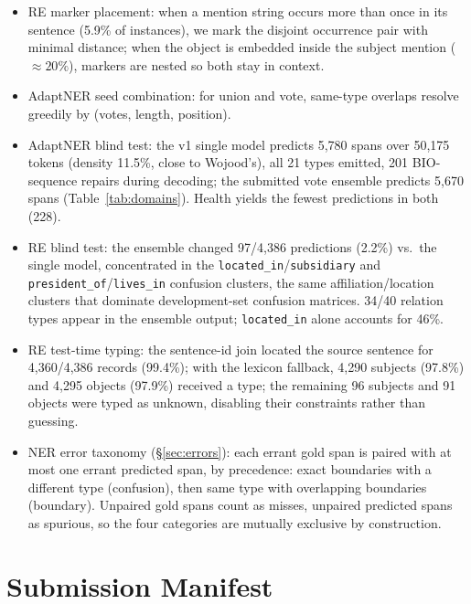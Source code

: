 \documentclass[11pt]{article}
\begin{document}
\begin{itemize}
\item RE marker placement: when a mention string occurs more than once
  in its sentence (5.9\% of instances), we mark the disjoint occurrence
  pair with minimal distance; when the object is embedded inside the
  subject mention (${\approx}20\%$), markers are nested so both stay in
  context.
\item AdaptNER seed combination: for union and vote, same-type overlaps
  resolve greedily by (votes, length, position).
\item AdaptNER blind test: the v1 single model predicts 5,780 spans over
  50,175 tokens (density 11.5\%, close to Wojood's), all 21 types emitted,
  201 BIO-sequence repairs during decoding; the submitted vote ensemble
  predicts 5,670 spans (Table~\ref{tab:domains}). Health yields the fewest
  predictions in both (228).
\item RE blind test: the ensemble changed 97/4,386 predictions (2.2\%)
  vs.\ the single model, concentrated in the
  \texttt{located\_in}/\texttt{subsidiary} and
  \texttt{president\_of}/\texttt{lives\_in} confusion clusters, the
  same affiliation/location clusters that dominate development-set
  confusion matrices.
  34/40 relation types appear in the ensemble output;
  \texttt{located\_in} alone accounts for 46\%.
\item RE test-time typing: the sentence-id join located the source
  sentence for 4,360/4,386 records (99.4\%); with the lexicon fallback,
  4,290 subjects (97.8\%) and 4,295 objects (97.9\%) received a type; the
  remaining 96 subjects and 91 objects were typed as unknown, disabling
  their constraints rather than guessing.
\item NER error taxonomy (\S\ref{sec:errors}): each errant gold span is
  paired with at most one errant predicted span, by precedence: exact
  boundaries with a different type (confusion), then same type with
  overlapping boundaries (boundary). Unpaired gold spans count as
  misses, unpaired predicted spans as spurious, so the four categories
  are mutually exclusive by construction.
\end{itemize}

\section{Submission Manifest}
\label{app:manifest}
\end{document}
